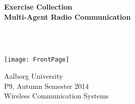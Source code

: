 \begin{center}
	\vspace*{1.5cm}
	
	\begin{Huge}
		\textbf{Exercise Collection\\
		Multi-Agent Radio Communication}
	\end{Huge}\\~\\
	
	\vspace*{2cm}
	
	\texttt{[image: FrontPage]}
	\vspace*{2cm}
    
	Aalborg University\\
	P9, Autumn Semester 2014\\
	Wireless Communication Systems\\
\end{center}